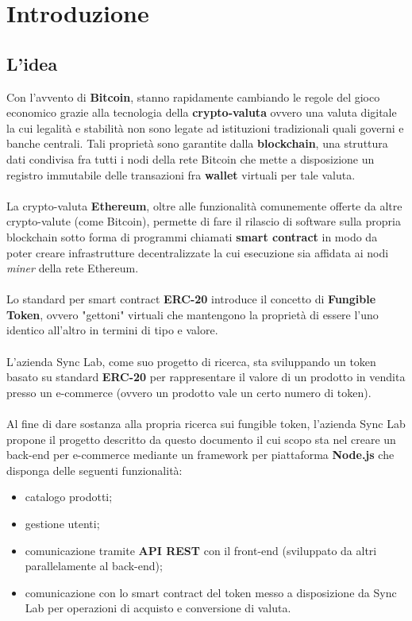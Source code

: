 
\chapter{Introduzione}
\label{cap:introduzione}

\section{L'idea}
Con l'avvento di \textbf{Bitcoin}, stanno rapidamente cambiando le regole del gioco economico grazie alla tecnologia della \textbf{crypto-valuta} ovvero una valuta digitale la cui legalità e stabilità non sono legate ad istituzioni tradizionali quali governi e banche centrali. Tali proprietà sono garantite dalla \textbf{blockchain}, una struttura dati condivisa fra tutti i nodi della rete Bitcoin che mette a disposizione un registro immutabile delle transazioni fra \textbf{wallet} virtuali per tale valuta.
\\\\
La crypto-valuta \textbf{Ethereum}, oltre alle funzionalità comunemente offerte da altre crypto-valute (come Bitcoin), permette di fare il rilascio di software sulla propria blockchain sotto forma di programmi chiamati \textbf{smart contract} in modo da poter creare infrastrutture decentralizzate la cui esecuzione sia affidata ai nodi \textit{miner} della rete Ethereum.
\\\\
Lo standard per smart contract \textbf{ERC-20} introduce il concetto di \textbf{Fungible Token}, ovvero "gettoni" virtuali che mantengono la proprietà di essere l'uno identico all'altro in termini di tipo e valore.
\\\\
L'azienda Sync Lab, come suo progetto di ricerca, sta sviluppando un token basato su standard \textbf{ERC-20} per rappresentare il valore di un prodotto in vendita presso un e-commerce (ovvero un prodotto vale un certo numero di token).
\\\\
Al fine di dare sostanza alla propria ricerca sui fungible token, l'azienda Sync Lab propone il progetto descritto da questo documento il cui scopo sta nel creare un back-end per e-commerce mediante un framework per piattaforma \textbf{Node.js} che disponga delle seguenti funzionalità:
\begin{itemize}
    \item catalogo prodotti;
    \item gestione utenti;
    \item comunicazione tramite \textbf{API REST} con il front-end (sviluppato da altri parallelamente al back-end);
    \item comunicazione con lo smart contract del token messo a disposizione da Sync Lab per operazioni di acquisto e conversione di valuta.
\end{itemize}


